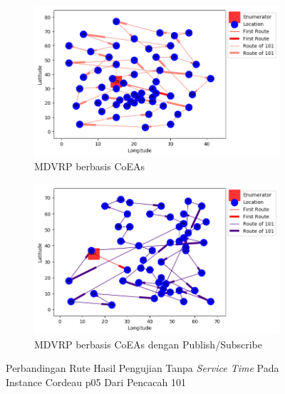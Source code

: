 \begin{figure}[H]
	\centering
	\begin{subfigure}[t]{\textwidth}
		\centering
		\includegraphics[width=\textwidth]{Resources/Images/cordeau_p05/cordeau_p05_notw_101_coes}
		\caption{MDVRP berbasis CoEAs}
		\label{fig:cordeau_p05_notw_101_coes}
	\end{subfigure}
	\begin{subfigure}[t]{\textwidth}
		\centering
		\includegraphics[width=\textwidth]{Resources/Images/cordeau_p05/cordeau_p05_notw_101_pubsub_coes}
		\caption{MDVRP berbasis CoEAs dengan Publish/Subscribe}
		\label{fig:cordeau_p05_notw_101_pubsub_coes}
	\end{subfigure}
	\caption{Perbandingan Rute Hasil Pengujian Tanpa \textit{Service Time} Pada Instance Cordeau p05 Dari Pencacah 101}
	\label{fig:cordeau_p05_notw_101}
\end{figure}


